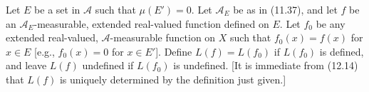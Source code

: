 Let $E$ be a set in $\mathcal{A}$ such that $\mu(E') = 0$. Let $\mathcal{A}_E$ be as in (11.37), and let $f$ be an $\mathcal{A}_E$-measurable, extended real-valued function defined on $E$. Let $f_0$ be any extended real-valued, $\mathcal{A}$-measurable function on $X$ such that $f_0(x) = f(x)$ for $x \in E$ [e.g., $f_0(x) = 0$ for $x \in E'$]. Define $L(f) = L(f_0)$ if $L(f_0)$ is defined, and leave $L(f)$ undefined if $L(f_0)$ is undefined. [It is immediate from (12.14) that $L(f)$ is uniquely determined by the definition just given.]
